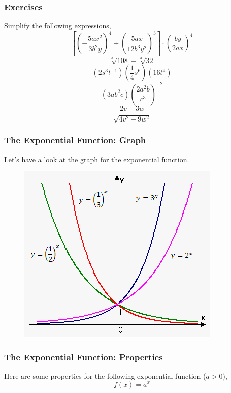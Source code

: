 \documentclass[xcolor=dvipsnames]{beamer}
\begin{document}
\begin{frame}
  \frametitle{Exercises}
Simplify the following expressions,
\begin{equation}
  \label{eq:phiuchai}
\left[\left(-\frac{5ax^{2}}{3b^{2}y}\right)^{4}\div\left(\frac{5ax}{12b^{3}y^{2}}\right)^{3}\right]\cdot\left(\frac{by}{2ax}\right)^{4}
\end{equation}
\begin{equation}
  \label{eq:taejahbo}
\sqrt[3]{108}-\sqrt[3]{32}
\end{equation}
\begin{equation}
  \label{eq:aineivee}
(2s^{3}t^{-1})\left(\frac{1}{4}s^{6}\right)(16t^{4})
\end{equation}
\begin{equation}
  \label{eq:woongais}
(3ab^{2}c)\left(\frac{2a^{2}b}{c^{3}}\right)^{-2}
\end{equation}
\begin{equation}
  \label{eq:waitaeku}
\frac{2v+3w}{\sqrt{4v^{2}-9w^{2}}}
\end{equation}
\end{frame}

\begin{frame}
  \frametitle{The Exponential Function: Graph}
Let's have a look at the graph for the exponential function.
  \begin{figure}[h]
    \includegraphics[scale=.6]{./1_2_exponential_function.png}
  \end{figure}
\end{frame}

\begin{frame}
  \frametitle{The Exponential Function: Properties}
  Here are some properties for the following exponential function
  ($a>0$),
\begin{equation}
  \label{eq:muwauzie}
  f(x)=a^{x}
\end{equation}
\end{frame}
\end{document}
